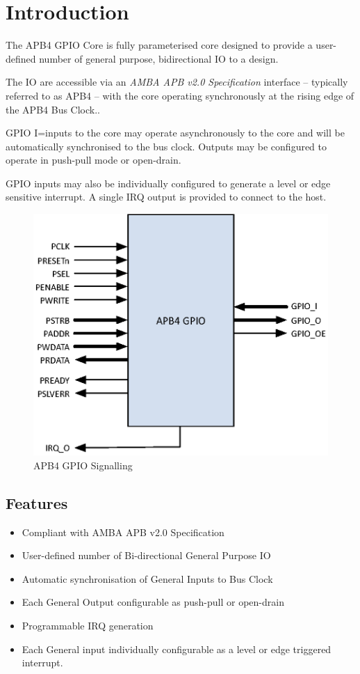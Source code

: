 \chapter{Introduction} \label{introduction}

The APB4 GPIO Core is fully parameterised core designed to provide a user-defined number of general purpose, bidirectional IO to a design.

The IO are accessible via an \emph{AMBA APB v2.0 Specification} interface -- typically referred to as APB4 -- with the core operating synchronously at the rising edge of the APB4 Bus Clock..

GPIO I=inputs to the core may operate asynchronously to the core and will be automatically synchronised to the bus clock. Outputs may be configured to operate in push-pull mode or open-drain.

GPIO inputs may also be individually configured to generate a level or edge sensitive interrupt. A single IRQ output is provided to connect to the host.

\begin{figure}[tbh]
	\centering
	\includegraphics{assets/img/apb4-gpio-sig}
	\caption{APB4 GPIO Signalling}
	\label{fig:apb4-gpio-sig}
\end{figure}

\section{Features}\label{features}

\begin{itemize}
\item
  Compliant with AMBA APB v2.0 Specification
\item
  User-defined number of Bi-directional General Purpose IO
\item
  Automatic synchronisation of General Inputs to Bus Clock
\item
  Each General Output configurable as push-pull or open-drain
\item
  Programmable IRQ generation
\item
  Each General input individually configurable as a level or edge triggered interrupt.
\end{itemize}
